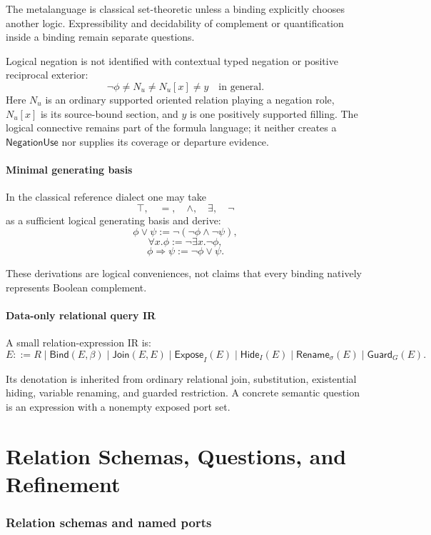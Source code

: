 \documentclass[11pt,oneside]{article}
\begin{document}
The metalanguage is classical set-theoretic unless a binding explicitly chooses another logic.  Expressibility and decidability of complement or quantification inside a binding remain separate questions.

Logical negation is not identified with contextual typed negation or positive reciprocal exterior:
\[
\boxed{
\neg\phi
\neq N_u
\neq N_u[x]
\neq y
\quad\text{in general}.
}
\]
Here \(N_u\) is an ordinary supported oriented relation playing a negation role, \(N_u[x]\) is its source-bound section, and \(y\) is one positively supported filling.  The logical connective remains part of the formula language; it neither creates a \(\mathsf{NegationUse}\) nor supplies its coverage or departure evidence.

\subsection{Minimal generating basis}

In the classical reference dialect one may take
\[
\top,\quad =,\quad \land,\quad \exists,\quad \neg
\]
as a sufficient logical generating basis and derive:
\[
\phi\lor\psi
:=
\neg(\neg\phi\land\neg\psi),
\]
\[
\forall x.\phi
:=
\neg\exists x.\neg\phi,
\]
\[
\phi\Rightarrow\psi
:=
\neg\phi\lor\psi.
\]

These derivations are logical conveniences, not claims that every binding natively represents Boolean complement.

\subsection{Data-only relational query IR}

A small relation-expression IR is:
\[
\boxed{
E ::=
R
\mid \mathsf{Bind}(E,\beta)
\mid \mathsf{Join}(E,E)
\mid \mathsf{Expose}_I(E)
\mid \mathsf{Hide}_I(E)
\mid \mathsf{Rename}_{\sigma}(E)
\mid \mathsf{Guard}_G(E).
}
\]

Its denotation is inherited from ordinary relational join, substitution, existential hiding, variable renaming, and guarded restriction.  A concrete semantic question is an expression with a nonempty exposed port set.

\part{Relation Schemas, Questions, and Refinement}

\section{Relation schemas and named ports}
\end{document}
